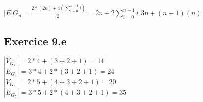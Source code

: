 \documentclass[fontsize=10pt]{article}
\begin{document}
$|E|G_n = \frac{2 * (2n) + 4(\displaystyle\sum_{i=0}^{n-1} i)}{2} =
2n + 2\displaystyle\sum_{i=0}^{n-1} i$ \hspace{1em} $3n + (n-1)(n)$


\subsection*{Exercice 9.e}
$|V_{G_4}| = 2*4+(3+2+1) = 14$\\
$|E_{G_4}| = 3*4+2 * (3+2+1) = 24$\\
$|V_{G_5}| = 2*5+(4+3+2+1) = 20$\\
$|E_{G_5}| = 3*5+2 * (4+3+2+1) = 35$
\end{document}
